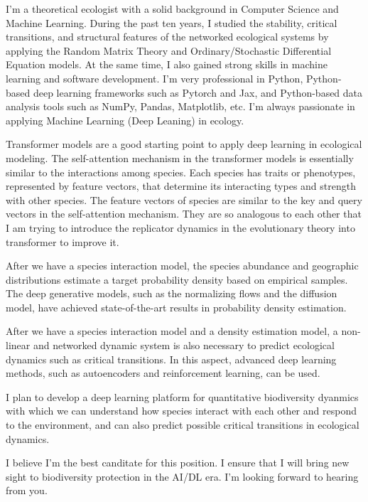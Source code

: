 I'm a theoretical ecologist with a solid background in Computer Science and Machine Learning. During the past ten years, I studied the stability, critical transitions, and structural features of the networked ecological systems by applying the Random Matrix Theory and Ordinary/Stochastic Differential Equation models. At the same time, I also gained strong skills in machine learning and software development. I'm very professional in Python, Python-based deep learning frameworks such as Pytorch and Jax, and Python-based data analysis tools such as NumPy, Pandas, Matplotlib, etc. I'm always passionate in applying Machine Learning (Deep Leaning) in ecology.

Transformer models are a good starting point to apply deep learning in ecological modeling. The self-attention mechanism in the transformer models is essentially similar to the interactions among species. Each species has traits or phenotypes, represented by feature vectors, that determine its interacting types and strength with other species. The feature vectors of species are similar to the key and query vectors in the self-attention mechanism. They are so analogous to each other that I am trying to introduce the replicator dynamics in the evolutionary theory into transformer to improve it.

After we have a species interaction model, the species abundance and geographic distributions estimate a target probability density based on empirical samples. The deep generative models, such as the normalizing flows and the diffusion model, have achieved state-of-the-art results in probability density estimation. 

After we have a species interaction model and a density estimation model, a non-linear and networked dynamic system is also necessary to predict ecological dynamics such as critical transitions. In this aspect, advanced deep learning methods, such as autoencoders and reinforcement learning, can be used.

I plan to develop a deep learning platform for quantitative biodiversity dyanmics with which we can understand how species interact with each other and respond to the environment, and can also predict possible critical transitions in ecological dynamics.

I believe I'm the best canditate for this position. I ensure that I will bring new sight to biodiversity protection in the AI/DL era. I'm looking forward to hearing from you.
